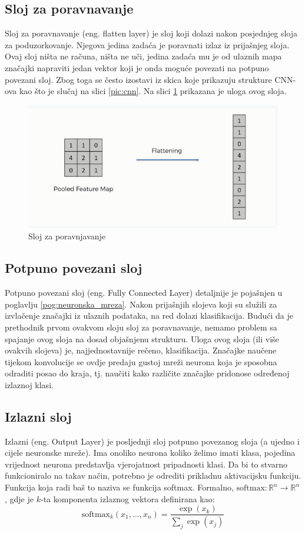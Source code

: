 \subsection{Sloj za poravnavanje}
Sloj za poravnavanje (eng. flatten layer) je sloj koji dolazi nakon posjednjeg sloja
za poduzorkovanje. Njegova jedina zadaća je poravnati izlaz iz prijašnjeg sloja.
Ovaj sloj ništa ne računa, ništa ne uči, jedina zadaća mu je od ulaznih mapa značajki
napraviti jedan vektor koji je onda moguće povezati na potpuno povezani sloj. Zbog
toga se često izostavi iz skica koje prikazuju strukture CNN-ova kao što je slučaj
na slici \ref{pic:cnn}. Na slici \ref{pic:flatten} prikazana je uloga ovog sloja.

\begin{figure}[htb]
    \centering
    \includegraphics[width=0.5\linewidth]{Chapters/neuronska_mreza/CNN/flatten.png} 
    \caption{Sloj za poravnjavanje \cite{flatten}}
    \label{pic:flatten}
\end{figure}


\subsection{Potpuno povezani sloj}
\label{sub:dense}
Potpuno povezani sloj (eng. Fully Connected Layer) detaljnije je pojašnjen u poglavlju
\ref{pog:neuronska_mreza}. Nakon prijašnjih slojeva koji su služili za izvlačenje
značajki iz ulaznih podataka, na red dolazi klasifikacija. Budući da je prethodnik
prvom ovakvom sloju sloj za poravnavanje, nemamo problem sa spajanje ovog sloja na dosad
objašnjenu strukturu. Uloga ovog sloja (ili više ovakvih slojeva) je, najjednostavnije
rečeno, klasifikacija. Značajke naučene tijekom konvolucije se ovdje predaju gustoj mreži
neurona koja je sposobna odraditi posao do kraja, tj. naučiti kako različite značajke
pridonose određenoj izlaznoj klasi.

\subsection{Izlazni sloj}
\label{sub:output}
Izlazni (eng. Output Layer) je posljednji sloj potpuno povezanog sloja (a ujedno i cijele
neuronske mreže). Ima onoliko neurona koliko želimo imati klasa, pojedina vrijednost
neurona predstavlja vjerojatnost pripadnosti klasi. Da bi to stvarno funkcioniralo na takav
način, potrebno je odrediti prikladnu aktivacijsku funkciju. Funkcija koja radi baš to 
naziva se funkcija softmax. 
Formalno, \( \text{softmax} : \mathbb{R}^n \to \mathbb{R}^n \),
gdje je \( k \)-ta komponenta izlaznog vektora definirana kao:
\begin{equation}
\text{softmax}_k(x_1, \dots, x_n) = \frac{\exp(x_k)}{\sum_{j} \exp(x_j)}
\end{equation}

